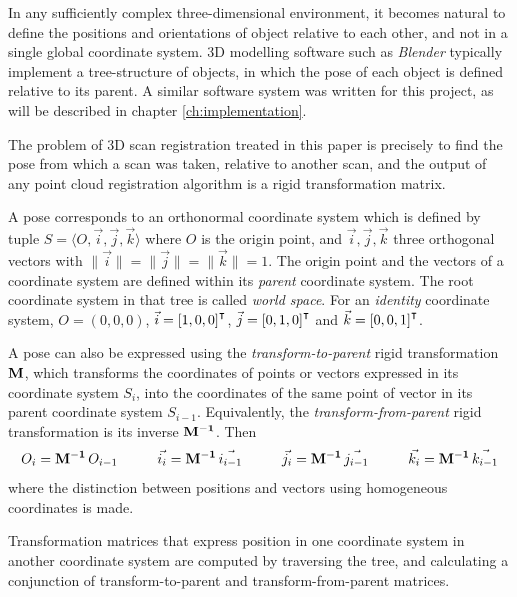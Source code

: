 In any sufficiently complex three-dimensional environment, it becomes natural to define the positions and orientations of object relative to each other, and not in a single global coordinate system. 3D modelling software such as \emph{Blender} typically implement a tree-structure of objects, in which the pose of each object is defined relative to its parent. A similar software system was written for this project, as will be described in chapter \ref{ch:implementation}.

The problem of 3D scan registration treated in this paper is precisely to find the pose from which a scan was taken, relative to another scan, and the output of any point cloud registration algorithm is a rigid transformation matrix.

A pose corresponds to an orthonormal coordinate system which is defined by tuple $S = \langle O, \vec{i}, \vec{j}, \vec{k} \rangle$ where $O$ is the origin point, and $\vec{i}, \vec{j}, \vec{k}$ three orthogonal vectors with $\|\vec{i}\| = \|\vec{j}\| = \|\vec{k}\| = 1$. The origin point and the vectors of a coordinate system are defined within its \emph{parent} coordinate system. The root coordinate system in that tree is called \emph{world space}. For an \emph{identity} coordinate system, $O = (0, 0, 0)$, $\vec{i} = \left[1, 0, 0\right]^\intercal$, $\vec{j} = \left[0, 1, 0\right]^\intercal$ and $\vec{k} = \left[0, 0, 1\right]^\intercal$.

A pose can also be expressed using the \emph{transform-to-parent} rigid transformation $\mathbf{M}$, which transforms the coordinates of points or vectors expressed in its coordinate system $S_i$, into the coordinates of the same point of vector in its parent coordinate system $S_{i-1}$. Equivalently, the \emph{transform-from-parent} rigid transformation is its inverse $\mathbf{M^{-1}}$. Then
\begin{equation}
	O_{i} = \mathbf{M^{-1}} \, O_{i-1}
	\hspace{1cm}
	\vec{i_{i}} = \mathbf{M^{-1}} \, \vec{i_{i-1}}
	\hspace{1cm}
	\vec{j_{i}} = \mathbf{M^{-1}} \, \vec{j_{i-1}}
	\hspace{1cm}
	\vec{k_{i}} = \mathbf{M^{-1}} \, \vec{k_{i-1}}
\end{equation}
where the distinction between positions and vectors using homogeneous coordinates is made.

Transformation matrices that express position in one coordinate system in another coordinate system are computed by traversing the tree, and calculating a conjunction of transform-to-parent and transform-from-parent matrices.


